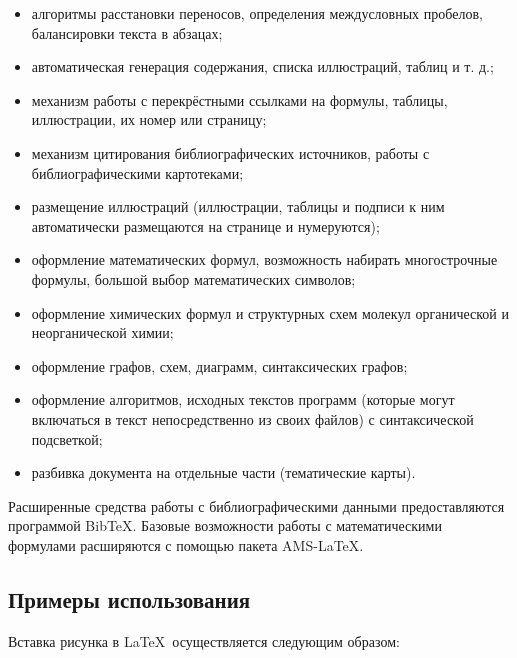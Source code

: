 \begin{itemize}
    \item алгоритмы расстановки переносов, определения междусловных пробелов, балансировки текста в абзацах;
    \item автоматическая генерация содержания, списка иллюстраций, таблиц и т. д.;
    \item механизм работы с перекрёстными ссылками на формулы, таблицы, иллюстрации, их номер или страницу;
    \item механизм цитирования библиографических источников, работы с библиографическими картотеками;
    \item размещение иллюстраций (иллюстрации, таблицы и подписи к ним автоматически размещаются на странице и нумеруются);
    \item оформление математических формул, возможность набирать многострочные формулы, большой выбор математических символов;
    \item оформление химических формул и структурных схем молекул органической и неорганической химии;
    \item оформление графов, схем, диаграмм, синтаксических графов;
    \item оформление алгоритмов, исходных текстов программ (которые могут включаться в текст непосредственно из своих файлов) с синтаксической подсветкой;
    \item разбивка документа на отдельные части (тематические карты).
\end{itemize}

Расширенные средства работы с библиографическими данными предоставляются программой Bib\TeX. Базовые возможности работы с математическими формулами расширяются с помощью пакета AMS-\LaTeX.

\subsection{Примеры использования}

Вставка рисунка в \LaTeX~осуществляется следующим образом:

